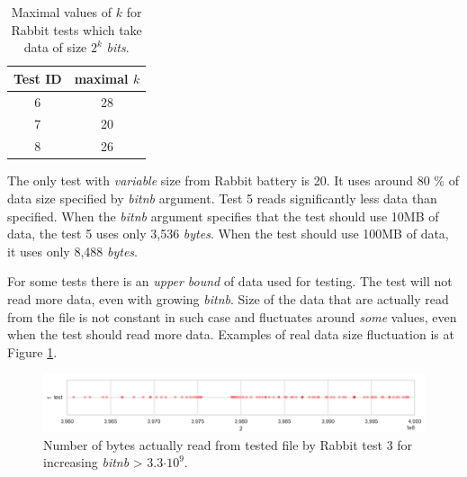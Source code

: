 \documentclass[
  digital,     %
  oneside,     %
  nosansbold,  %
  nocolorbold, %
  nolof,         %
  nolot,         %
]{fithesis4}
\begin{document}
\begin{table}[H]
  \begin{tabularx}{0.33\textwidth}{c|c}
    Test ID & maximal $k$\\
    \midrule
    6& 28\\
    7& 20\\
    8& 26\\
 
  \end{tabularx}
  \caption{Maximal values of $k$ for Rabbit tests which take data of size $2^k$ \emph{bits}.}
  \label{tab:analysis_rabbit_two_powers}
\end{table}

The only test with \emph{variable} size from Rabbit battery is 20. It uses around 80 \% of data size specified by \emph{bit\textunderscore nb} argument. Test 5 reads significantly less data than specified. When the \emph{bit\textunderscore nb} argument specifies that the test should use 10MB of data, the test 5 uses only  3,536 \emph{bytes}. When the test should use 100MB of data, it uses only 8,488 \emph{bytes}.

For some tests there is an \emph{upper bound} of data used for testing. The test will not read more data, even with growing \emph{bit\textunderscore nb}. Size of the data that are actually read from the file is not constant in such case and fluctuates around \emph{some} values, even when the test should read more data. Examples of real data size fluctuation is at Figure \ref{fig:analysis-rabbit-max}.

\begin{figure}
  \begin{center}
    \includegraphics[width=12.5cm]{figures/rabbit_3_maxims.png}
  \end{center}
  \caption{Number of bytes actually read from tested file by Rabbit test 3 for increasing \emph{bit\textunderscore nb} > 3.3$\cdot10^{9}$.}
  \label{fig:analysis-rabbit-max}
\end{figure}
\end{document}
